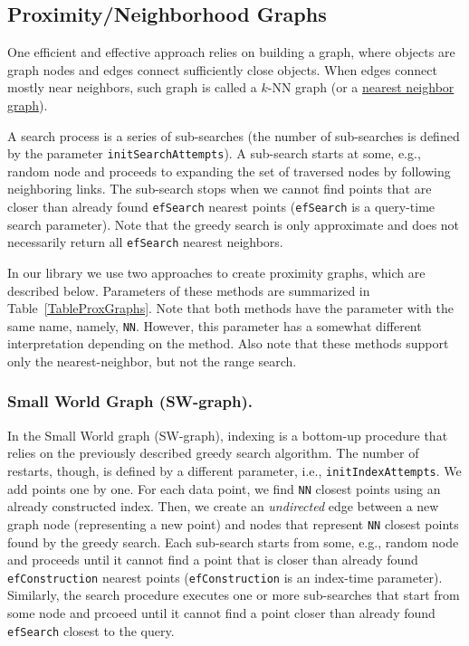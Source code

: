\documentclass[runningheads,a4paper]{llncs}
\newcommand{\ttt}[1]{\texttt{#1}}
\newcommand{\knn}{$k$-NN }
\begin{document}
\subsection{Proximity/Neighborhood Graphs} \label{SectionProxGraph}
One efficient and effective approach
relies on building a graph, where objects are graph nodes and edges connect sufficiently close objects.
When edges connect mostly near neighbors, such graph is called a \knn graph (or a \href{https://en.wikipedia.org/wiki/Nearest_neighbor_graph}{nearest neighbor graph}).

A search process is a series of sub-searches 
(the number of sub-searches is defined by the parameter \ttt{initSearchAttempts}).
A sub-search starts at some, e.g., random node and proceeds to expanding the set of traversed nodes by following neighboring links. The sub-search stops when we cannot find points 
that are closer than already found \ttt{efSearch} nearest points (\ttt{efSearch} is a query-time search parameter).
Note that the greedy search is only approximate and does not necessarily return all \ttt{efSearch} nearest neighbors.

In our library we use two approaches to create proximity graphs, which are described below.
Parameters of these methods are summarized in Table~\ref{TableProxGraphs}.
Note that both methods have the parameter with the same name, namely, \ttt{NN}.
However, this parameter has a somewhat different interpretation depending on the method.
Also note that these methods support only the nearest-neighbor, but not the range search.

\subsubsection{Small World Graph (SW-graph).} \label{SectionSWGraph}
In the Small World graph (SW-graph),
indexing is a bottom-up procedure that relies on the previously described greedy search algorithm.  
The number of restarts, though, is defined by a different parameter, i.e., \ttt{initIndexAttempts}.
We add points one by one. For each data point, 
we find \ttt{NN} closest points using an already constructed index.
Then, we create an \emph{undirected} edge between a new graph node (representing a new point) 
and nodes that represent \ttt{NN} closest points found by the greedy search. 
Each sub-search starts from some, e.g., random node and proceeds until it cannot find a point that is closer
than already found \ttt{efConstruction} nearest points (\ttt{efConstruction} is an index-time parameter).
Similarly, the search procedure executes one or more sub-searches that start from some node and prcoeed
until it cannot find a point closer than already found \ttt{efSearch} closest to the query.
\end{document}
